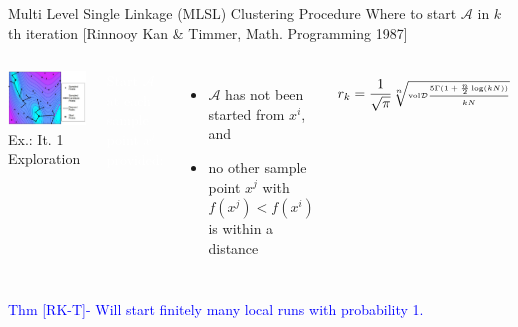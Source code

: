 \documentclass[handout,aspectratio=54]{beamer}
\numberwithin{theorem}{section}
\begin{document}
\begin{frame}{Multi Level Single Linkage (MLSL) Clustering Procedure}
\small
Where to start $\mathcal{A}$ in $k$th iteration \scriptsize\textcolor[RGB]{128,0,128}{ [Rinnooy Kan \& Timmer, Math. Programming 1987]}
\normalsize

\begin{columns}
\includegraphics[width=\textwidth]{fig/39-3.jpg}
Ex.: It. 1 Exploration

\colorbox[rgb]{0.5,0.6,0.7}{\textcolor{white}{Start $\mathcal{A}$ at each sample point}}
\colorbox[rgb]{0.5,0.6,0.7}{\textcolor{white}{$x^i$ provided:}}

\begin{itemize}
\item $\mathcal{A}$ has not been started from $x^i$, and
\item no other sample point $x^j$ with $f(x^j)<f(x^i)$ is within a distance
\end{itemize}
\begin{equation*}\tiny
r_k=\frac{1}{\sqrt{\pi}}\sqrt[n]{\textup{vol}\mathcal{D}\frac{5\Gamma(1+\frac{n}{2}\log(kN))}{kN}}
\end{equation*}
\end{columns}

\textcolor{blue}{Thm [RK-T]- Will start finitely many local runs with probability 1.}
\end{frame}
\end{document}
